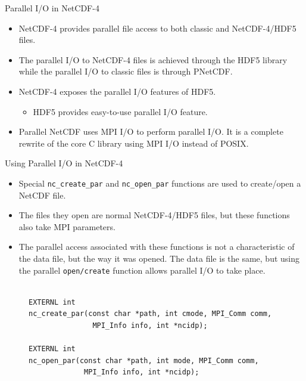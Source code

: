 \documentclass[compress,11pt,xcolor=svgnames,aspectratio=169]{beamer}
\begin{document}
\begin{frame}[fragile]{Parallel I/O in NetCDF-4}

\begin{itemize}
\setlength\itemsep{0.6cm}

  \item NetCDF-4 provides parallel file access to both classic and NetCDF-4/HDF5 files.

  \item The parallel I/O to NetCDF-4 files is achieved through the HDF5 library while the parallel I/O to classic files is through PNetCDF.

  \item NetCDF-4 exposes the parallel I/O features of HDF5.
    \begin{itemize}
    \item HDF5 provides easy-to-use parallel I/O feature.
    \end{itemize}

  \item Parallel NetCDF uses MPI I/O to perform parallel I/O. It is a complete rewrite of the core C library using MPI I/O instead of POSIX.

\end{itemize}

\end{frame}

\begin{frame}[fragile]{Using Parallel I/O in NetCDF-4}

\begin{itemize}
\setlength\itemsep{0.3cm}

  \item Special \verb|nc_create_par| and \verb|nc_open_par| functions are used to create/open a NetCDF file.

  \item The files they open are normal NetCDF-4/HDF5 files, but these functions also take MPI parameters.

  \item The parallel access associated with these functions is not a characteristic of the data file, but the way it was opened. The data file is the same, but using the parallel \verb|open/create| function allows parallel I/O to take place.

\end{itemize}

\begin{figure}
\centering
\begin{varwidth}{\linewidth}
{ \tiny

\begin{verbatim}

EXTERNL int
nc_create_par(const char *path, int cmode, MPI_Comm comm,
               MPI_Info info, int *ncidp);

EXTERNL int
nc_open_par(const char *path, int mode, MPI_Comm comm,
             MPI_Info info, int *ncidp);

\end{verbatim}

}
\end{varwidth}
\end{figure}

\end{frame}
\end{document}
